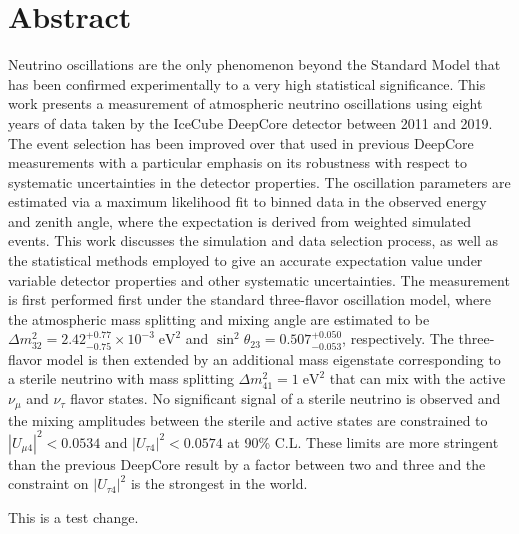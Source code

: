 \chapter{Abstract}

Neutrino oscillations are the only phenomenon beyond the Standard Model that has been confirmed experimentally to a very high statistical significance.
This work presents a measurement of atmospheric neutrino oscillations using eight years of data taken by the IceCube DeepCore detector between 2011 and 2019.
The event selection has been improved over that used in previous DeepCore measurements with a particular emphasis on its robustness with respect to systematic uncertainties in the detector properties.
The oscillation parameters are estimated via a maximum likelihood fit to binned data in the observed energy and zenith angle, where the expectation is derived from weighted simulated events.
This work discusses the simulation and data selection process, as well as the statistical methods employed to give an accurate expectation value under variable  detector properties and other systematic uncertainties.
The measurement is first performed first under the standard three-flavor oscillation model, where the atmospheric mass splitting and mixing angle are estimated to be $\Delta m^2_{32} = 2.42_{-0.75}^{+0.77} \times10^{-3}\;\mathrm{eV}^2$ and $\sin^2\theta_{23} = 0.507_{-0.053}^{+0.050}$, respectively.
The three-flavor model is then extended by an additional mass eigenstate corresponding to a sterile neutrino with mass splitting $\Delta m^2_{41} = 1\;\mathrm{eV}^2$ that can mix with the active $\nu_\mu$ and $\nu_\tau$ flavor states.
No significant signal of a sterile neutrino is observed and the mixing amplitudes between the sterile and active states are constrained to $|U_{\mu 4}|^2 < 0.0534$ and $|U_{\tau 4}|^2 < 0.0574$ at 90\% C.L.
These limits are more stringent than the previous DeepCore result by a factor between two and three and the constraint on $|U_{\tau 4}|^2$ is the strongest in the world.

This is a test change.